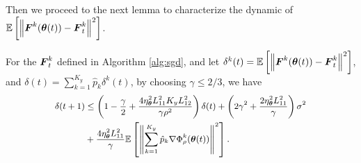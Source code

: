 Then we proceed to the next lemma to characterize the dynamic of $\mathbb{E}\left[\left\|\boldsymbol{F}^{k}(\text{\boldmath{$\theta$}}(t)) - \boldsymbol{F}_{t}^{k}\right\|^{2}\right]$. 
\begin{lemma}
	\label{lem:delta dynamic}
	For the $\boldsymbol{F}_{t}^{k}$ defined in Algorithm \ref{alg:sgd}, and let $\delta^{k}(t) = \mathbb{E}\left[\left\|\boldsymbol{F}^{k}(\text{\boldmath{$\theta$}}(t)) - \boldsymbol{F}_{t}^{k}\right\|^{2}\right]$, and $\delta(t) = \sum_{k=1}^{K_{y}}\hat{p}_{k}\delta^{k}(t)$, by choosing $\gamma \leq 2/3$, we have 
	\begin{equation}
		\small
		\begin{aligned}
			\delta(t + 1) & \leq \left(1 - \frac{\gamma}{2} + \frac{4\eta_{\btheta}^{2}L_{11}^{2}K_{y}L_{12}^{2}}{\gamma\rho^{2}}\right)\delta(t) + \left(2\gamma^{2} + \frac{2\eta_{\btheta}^{2}L_{11}^{2}}{\gamma}\right)\sigma^{2} \\
			& + \frac{4\eta_{\btheta}^{2}L_{11}^{2}}{\gamma}\mE\left[\left\|\sum\limits_{k = 1}^{K_{y}}\hat{p}_{k}\nabla\Phi_{\rho}^{k}(\btheta(t))\right\|^{2}\right]. 
		\end{aligned}
	\end{equation}
\end{lemma}
